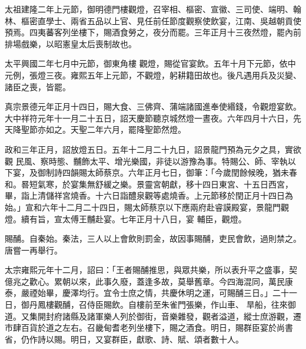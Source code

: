 \begin{pinyinscope}
 太祖建隆二年上元節，御明德門樓觀燈，召宰相、樞密、宣徽、三司使、端明、翰林、樞密直學士、兩省五品以上官、見任前任節度觀察使飲宴，江南、吳越朝貢使預焉。四夷蕃客列坐樓下，賜酒食勞之，夜分而罷。三年正月十三夜然燈，罷內前排場戲樂，以昭憲皇太后喪制故也。



 太平興國二年七月中元節，御東角樓
 觀燈，賜從官宴飲。五年十月下元節，依中元例，張燈三夜。雍熙五年上元節，不觀燈，躬耕籍田故也。後凡遇用兵及災變、諸臣之喪，皆罷。



 真宗景德元年正月十四日，賜大食、三佛齊、蒲端諸國進奉使緡錢，令觀燈宴飲。大中祥符元年十一月二十五日，詔天慶節聽京城然燈一晝夜。六年四月十六日，先天降聖節亦如之。天聖二年六月，罷降聖節然燈。



 政和三年正月，詔放燈五日。五年十二月二十九日，詔景龍門預為元夕之具，實欲觀
 民風、察時態、黼飾太平、增光樂國，非徒以游豫為事。特賜公、師、宰執以下宴，及御制詩四韻賜太師蔡京。六年正月七日，御筆：「今歲閏餘候晚，猶未春和。晷短氣寒，於宴集無舒緩之樂。景靈宮朝獻，移十四日東宮、十五日西宮，畢，詣上清儲祥宮燒香。十六日詣醴泉觀等處燒香。上元節移於閏正月十四日為始。」宣和六年十二月二十四日，賜太師蔡京以下應兩府赴睿謨殿宴，景龍門觀燈。續有旨，宣太傅王黼赴宴。七年正月十八日，宴
 輔臣，觀燈。



 賜酺。自秦始。秦法，三人以上會飲則罰金，故因事賜酺，吏民會飲，過則禁之。唐嘗一再舉行。



 太宗雍熙元年十二月，詔曰：「王者賜酺推思，與眾共樂，所以表升平之盛事，契億兆之歡心。累朝以來，此事久廢，蓋逢多故，莫舉舊章。今四海混同，萬民康泰，嚴禋始畢，慶澤均行。宜令士庶之情，共慶休明之運，可賜酺三日。」二十一日，御丹鳳樓觀酺，召侍臣賜飲。自樓前至朱雀門張樂，作山車、
 旱船，往來御道。又集開封府諸縣及諸軍樂人列於御街，音樂雜發，觀者溢道，縱士庶游觀，遷市肆百貨於道之左右。召畿甸耆老列坐樓下，賜之酒食。明日，賜群臣宴於尚書省，仍作詩以賜。明日，又宴群臣，獻歌、詩、賦、頌者數十人。




\end{pinyinscope}
